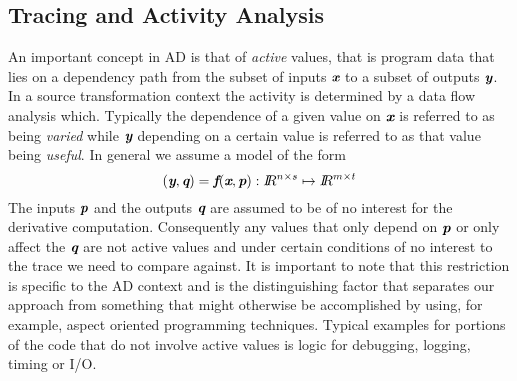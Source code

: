 \documentclass{article}
\newcommand{\R}{I\!\!R}
\newcommand{\bmf}{\mbox{\bf\em f}}
\newcommand{\bmp}{\mbox{\bf\em p}}
\newcommand{\bmq}{\mbox{\bf\em q}}
\newcommand{\bmx}{\mbox{\bf\em x}}
\newcommand{\bmy}{\mbox{\bf\em y}}
\begin{document}
\subsection{Tracing and Activity Analysis}\label{sec:ActivityAnalysis}
An important concept in AD is that of {\em active} values, that is 
program data that lies on a dependency path from the subset of inputs $\bmx$ to 
a subset of outputs $\bmy$. 
In a source transformation context the activity is determined by a data flow 
analysis which. Typically the dependence of a given value on $\bmx$ is 
referred to as being {\em varied} while $\bmy$ depending on 
a certain value is referred to as that value being {\em useful}.   
In general we assume a model of the form 
\[
(\bmy,\bmq)=\bmf(\bmx,\bmp): \R^{n\times s}\mapsto \R^{m\times t}
\]
The inputs $\bmp$ and the outputs $\bmq$  are assumed to be of no interest 
for the derivative computation. Consequently any values that only depend on
$\bmp$ or only affect the $\bmq$ are not active values and  
under certain conditions of no interest to the trace we need to compare against. 
It is important to note that this restriction is specific to the AD context 
and is the distinguishing factor that separates our  approach  
from something that might otherwise be accomplished 
by using, for example, aspect oriented programming techniques. 
Typical examples for portions of the code that do not involve active values 
is logic for debugging, logging, timing or I/O.   
\end{document}
